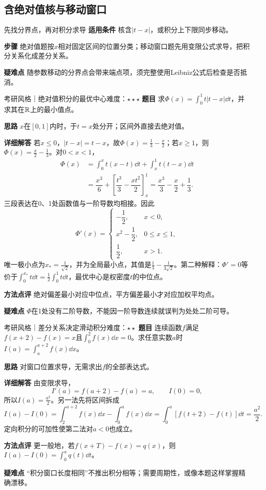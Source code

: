 \subsection{含绝对值核与移动窗口}\label{ci:kernelwindow}
\begin{method}{先找分界点，再对积分求导}
\textbf{适用条件} 核含$|t-x|$，或积分上下限同步移动。\par
\textbf{步骤} 绝对值题按$x$相对固定区间的位置分类；移动窗口题先用变限公式求导，把积分关系化成差分关系。\par
\textbf{疑难点} 随参数移动的分界点会带来端点项，须完整使用Leibniz公式后检查是否抵消。
\end{method}
\begin{example}{考研风格｜绝对值积分的最优中心}{难度：$\star\star\star$}\label{ci:ex:absolutekernel}
\textbf{题目} 求$\Phi(x)=\int_0^1t|t-x|\dd t$，并求其在$\mathbb{R}$上的最小值点。\par
\textbf{思路} $x$在$[0,1]$内时，于$t=x$处分开；区间外直接去绝对值。\par
\textbf{详细解答} 若$x\le0$，$|t-x|=t-x$，故$\Phi(x)=\frac{1}{3}-\frac{x}{2}$；若$x\ge1$，则$\Phi(x)=\frac{x}{2}-\frac{1}{3}$。对$0<x<1$，
\begin{align*}
 \Phi(x)
 &=\int_0^xt(x-t)\dd t+\int_x^1t(t-x)\dd t\\
 &=\dfrac{x^3}6+\left[\dfrac{t^3}3-\dfrac{xt^2}2\right]_x^1
 =\dfrac{x^3}3-\dfrac x2+\dfrac13.
\end{align*}
三段表达在0、1处函数值与一阶导数均相接。因此
\[
 \Phi'(x)=
 \begin{cases}
 -\dfrac{1}{2},&x<0,\\
 x^2-\dfrac{1}{2},&0\le x\le1,\\
 \dfrac{1}{2},&x>1.
 \end{cases}
\]
唯一极小点为$x_*=\frac{1}{\sqrt2}$，并为全局最小点，其值是$\frac{1}{3}-\frac{1}{3\sqrt2}$。第二种解释：$\Phi'=0$等价于$\int_0^{x_*}t\dd t=\frac12\int_0^1t\dd t$，最优中心是权密度$t$的中位点。\par
\textbf{方法点评} 绝对偏差最小对应中位点，平方偏差最小才对应加权平均点。\par
\textbf{疑难点} $\Phi$在1处没有二阶导数，不能因一阶导数连续就误判为处处二阶可导。
\end{example}
\begin{example}{考研风格｜差分关系决定滑动积分}{难度：$\star\star$}\label{ci:ex:window}
\textbf{题目} 连续函数$f$满足$f(x+2)-f(x)=x$且$\int_0^2f(x)\dd x=0$。求任意实数$a$时$I(a)=\int_a^{a+2}f(x)\dd x$。\par
\textbf{思路} 对窗口位置求导，无需求出$f$的全部表达式。\par
\textbf{详细解答} 由变限求导，
\[
 I'(a)=f(a+2)-f(a)=a,\qquad I(0)=0,
\]
所以$I(a)=\frac{a^2}{2}$。另一法先将区间拆成
\[
 I(a)-I(0)=\int_2^{a+2}f(x)\dd x-\int_0^af(x)\dd x
 =\int_0^a[f(t+2)-f(t)]\dd t=\dfrac{a^2}2.
\]
定向积分的可加性使第二法对$a<0$也成立。\par
\textbf{方法点评} 更一般地，若$f(x+T)-f(x)=q(x)$，则$I(a)-I(0)=\int_0^aq(t)\dd t$。\par
\textbf{疑难点} “积分窗口长度相同”不推出积分相等；需要周期性，或像本题这样掌握精确漂移。
\end{example}

